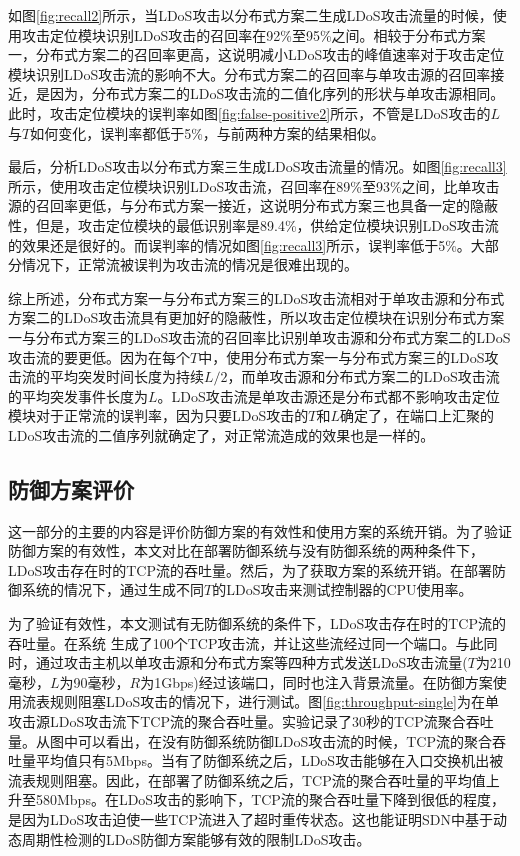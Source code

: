 如图\ref{fig:recall2}所示，当LDoS攻击以分布式方案二生成LDoS攻击流量的时候，使用攻击定位模块识别LDoS攻击的召回率在92\%至95\%之间。相较于分布式方案一，分布式方案二的召回率更高，这说明减小LDoS攻击的峰值速率对于攻击定位模块识别LDoS攻击流的影响不大。分布式方案二的召回率与单攻击源的召回率接近，是因为，分布式方案二的LDoS攻击流的二值化序列的形状与单攻击源相同。此时，攻击定位模块的误判率如图\ref{fig:false-positive2}所示，不管是LDoS攻击的$L$与$T$如何变化，误判率都低于5\%，与前两种方案的结果相似。

最后，分析LDoS攻击以分布式方案三生成LDoS攻击流量的情况。如图\ref{fig:recall3}所示，使用攻击定位模块识别LDoS攻击流，召回率在89\%至93\%之间，比单攻击源的召回率更低，与分布式方案一接近，这说明分布式方案三也具备一定的隐蔽性，但是，攻击定位模块的最低识别率是89.4\%，供给定位模块识别LDoS攻击流的效果还是很好的。而误判率的情况如图\ref{fig:recall3}所示，误判率低于5\%。大部分情况下，正常流被误判为攻击流的情况是很难出现的。

综上所述，分布式方案一与分布式方案三的LDoS攻击流相对于单攻击源和分布式方案二的LDoS攻击流具有更加好的隐蔽性，所以攻击定位模块在识别分布式方案一与分布式方案三的LDoS攻击流的召回率比识别单攻击源和分布式方案二的LDoS攻击流的要更低。因为在每个$T$中，使用分布式方案一与分布式方案三的LDoS攻击流的平均突发时间长度为持续$L/2$，而单攻击源和分布式方案二的LDoS攻击流的平均突发事件长度为$L$。LDoS攻击流是单攻击源还是分布式都不影响攻击定位模块对于正常流的误判率，因为只要LDoS攻击的$T$和$L$确定了，在端口上汇聚的LDoS攻击流的二值序列就确定了，对正常流造成的效果也是一样的。


\subsection{防御方案评价}
\label{chap05:evaluaion}

这一部分的主要的内容是评价防御方案的有效性和使用方案的系统开销。为了验证防御方案的有效性，本文对比在部署防御系统与没有防御系统的两种条件下，LDoS攻击存在时的TCP流的吞吐量。然后，为了获取方案的系统开销。在部署防御系统的情况下，通过生成不同$T$的LDoS攻击来测试控制器的CPU使用率。

为了验证有效性，本文测试有无防御系统的条件下，LDoS攻击存在时的TCP流的吞吐量。在系统
生成了100个TCP攻击流，并让这些流经过同一个端口。与此同时，通过攻击主机以单攻击源和分布式方案等四种方式发送LDoS攻击流量($T$为210毫秒，$L$为90毫秒，$R$为1Gbps)经过该端口，同时也注入背景流量。在防御方案使用流表规则阻塞LDoS攻击的情况下，进行测试。图\ref{fig:throughput-single}为在单攻击源LDoS攻击流下TCP流的聚合吞吐量。实验记录了30秒的TCP流聚合吞吐量。从图中可以看出，在没有防御系统防御LDoS攻击流的时候，TCP流的聚合吞吐量平均值只有5Mbps。当有了防御系统之后，LDoS攻击能够在入口交换机出被流表规则阻塞。因此，在部署了防御系统之后，TCP流的聚合吞吐量的平均值上升至580Mbps。在LDoS攻击的影响下，TCP流的聚合吞吐量下降到很低的程度，是因为LDoS攻击迫使一些TCP流进入了超时重传状态。这也能证明SDN中基于动态周期性检测的LDoS防御方案能够有效的限制LDoS攻击。

